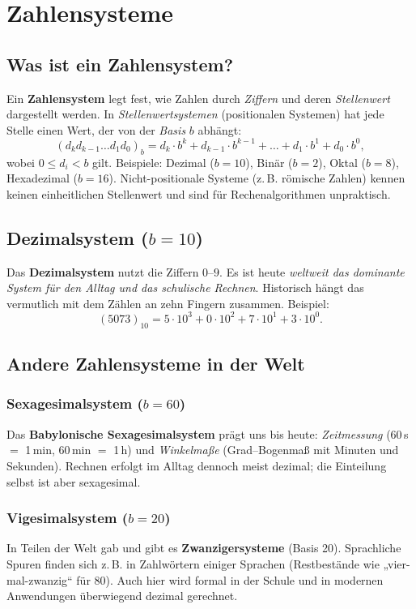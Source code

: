 \documentclass[../skript/main.tex]{subfiles}
\begin{document}
\chapter{Zahlensysteme}\label{chap:zahlensysteme}

\section{Was ist ein Zahlensystem?}
Ein \textbf{Zahlensystem} legt fest, wie Zahlen durch \emph{Ziffern} und deren \emph{Stellenwert} dargestellt werden.
In \emph{Stellenwertsystemen} (positionalen Systemen) hat jede Stelle einen Wert, der von der \emph{Basis} \(b\) abhängt:
\[
(d_k d_{k-1}\ldots d_1 d_0)_b
= d_k\cdot b^{k}+d_{k-1}\cdot b^{k-1}+\ldots + d_1\cdot b^1 + d_0\cdot b^0,
\]
wobei \(0 \le d_i < b\) gilt. Beispiele: Dezimal (\(b=10\)), Binär (\(b=2\)), Oktal (\(b=8\)), Hexadezimal (\(b=16\)).
Nicht-positionale Systeme (z.\,B. römische Zahlen) kennen keinen einheitlichen Stellenwert und sind für Rechenalgorithmen unpraktisch.

\section{Dezimalsystem (\(b=10\))}
Das \textbf{Dezimalsystem} nutzt die Ziffern \(0\)–\(9\).
Es ist heute \emph{weltweit das dominante System für den Alltag und das schulische Rechnen}.
Historisch hängt das vermutlich mit dem Zählen an zehn Fingern zusammen.
Beispiel:
\[
(5073)_{10} = 5\cdot 10^3 + 0\cdot 10^2 + 7\cdot 10^1 + 3\cdot 10^0.
\]

\section{Andere Zahlensysteme in der Welt}
\subsection*{Sexagesimalsystem (\(b=60\))}
Das \textbf{Babylonische Sexagesimalsystem} prägt uns bis heute: \emph{Zeitmessung} (60\,s \(=\) 1\,min, 60\,min \(=\) 1\,h) und \emph{Winkelmaße} (Grad–Bogenmaß mit Minuten und Sekunden). Rechnen erfolgt im Alltag dennoch meist dezimal; die Einteilung selbst ist aber sexagesimal.

\subsection*{Vigesimalsystem (\(b=20\))}
In Teilen der Welt gab und gibt es \textbf{Zwanzigersysteme} (Basis 20).
Sprachliche Spuren finden sich z.\,B. in Zahlwörtern einiger Sprachen (Restbestände wie „vier-mal-zwanzig“ für 80).
Auch hier wird formal in der Schule und in modernen Anwendungen überwiegend dezimal gerechnet.
\end{document}
